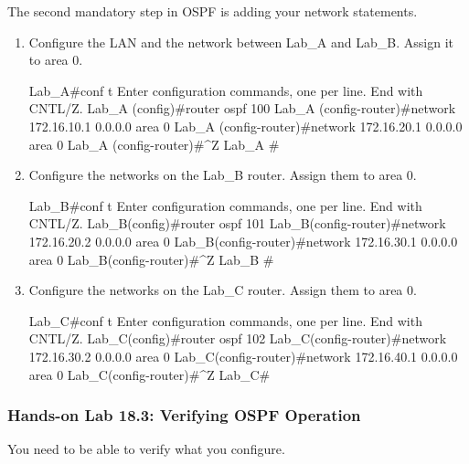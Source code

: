 The second mandatory step in OSPF is adding your network statements.

\begin{enumerate}
\item
  Configure the LAN and the network between Lab\_A and Lab\_B. Assign it
  to area 0.

\begin{cli}
Lab_A#conf t
Enter configuration commands, one per line.
  End with CNTL/Z.
Lab_A (config)#router ospf 100
Lab_A (config-router)#network 172.16.10.1 0.0.0.0 area 0
Lab_A (config-router)#network 172.16.20.1 0.0.0.0 area 0
Lab_A (config-router)#^Z
Lab_A #
\end{cli}
\item
  Configure the networks on the Lab\_B router. Assign them to area 0.

\begin{cli}
Lab_B#conf t
Enter configuration commands, one per line.
  End with CNTL/Z.
Lab_B(config)#router ospf 101
Lab_B(config-router)#network 172.16.20.2 0.0.0.0 area 0
Lab_B(config-router)#network 172.16.30.1 0.0.0.0 area 0
Lab_B(config-router)#^Z
Lab_B #
\end{cli}
\item
  Configure the networks on the Lab\_C router. Assign them to area 0.

\begin{cli}
Lab_C#conf t
Enter configuration commands, one per line.
  End with CNTL/Z.
Lab_C(config)#router ospf 102
Lab_C(config-router)#network 172.16.30.2 0.0.0.0 area 0
Lab_C(config-router)#network 172.16.40.1 0.0.0.0 area 0
Lab_C(config-router)#^Z
Lab_C#
\end{cli}
\end{enumerate}

\subsubsection[Hands-on Lab 18.3: Verifying OSPF
Operation]{\texorpdfstring{\protect\hypertarget{c18.xhtmlux5cux23c18-sec-23}{}{}Hands-on
Lab 18.3: Verifying OSPF
Operation}{Hands-on Lab 18.3: Verifying OSPF Operation}}

You need to be able to verify what you configure.

